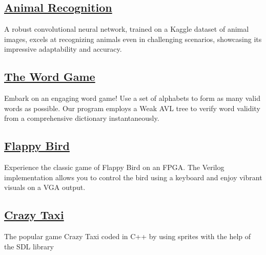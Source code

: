 \documentclass[]{resume}
\begin{document}

    \subsection{\href{https://github.com/aliasgharchakera/AI-Fall22-Project}{\textbf{Animal Recognition}}}%
    A robust convolutional neural network, trained on a Kaggle dataset of animal images, excels at recognizing animals even in challenging scenarios, showcasing its impressive adaptability and accuracy.

    \subsection{\href{https://github.com/aliasgharchakera/DS2-Spring22-Project}{\textbf{The Word Game}}}%
    Embark on an engaging word game! Use a set of alphabets to form as many valid words as possible. Our program employs a Weak AVL tree to verify word validity from a comprehensive dictionary instantaneously.

    
    \subsection{\href{https://github.com/aliasgharchakera/DLD-Fall21-Project}{\textbf{Flappy Bird}}}%
    Experience the classic game of Flappy Bird on an FPGA. The Verilog implementation allows you to control the bird using a keyboard and enjoy vibrant visuals on a VGA output.

    \subsection{\href{https://github.com/aliasgharchakera/OOP-Fall21-Project}{\textbf{Crazy Taxi}}}%
    The popular game Crazy Taxi coded in C++ by using sprites with the help of the SDL library
\end{document}
